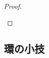 \documentclass[TQFT_main]{subfiles}
\begin{document}
\begin{proof}
\begin{enumerate}
    \end{enumerate}
    
\end{proof}


\subsection{環の小技}



    
\end{document}
